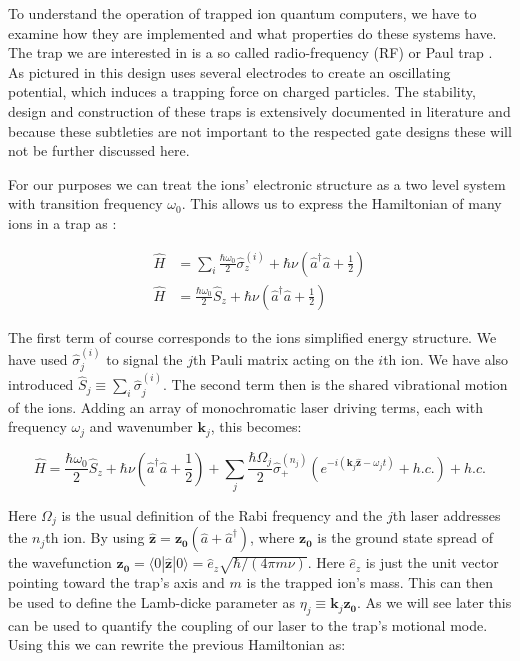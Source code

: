 \documentclass[12pt,twoside]{report}
\begin{document}
To understand the operation of trapped ion quantum computers, we have to examine how they are implemented and what properties do these systems have. The trap we are interested in is a so called radio-frequency (RF) or Paul trap \cite{RF_Traps, Charged_Particle_traps_Paul}. As pictured in  this design uses several electrodes to create an oscillating potential, which induces a trapping force on charged particles. The stability, design and construction of these traps is extensively documented in literature \cite{Charged_Particle_traps_Paul,RF_Traps} and because these subtleties are not important to the respected gate designs these will not be further discussed here.

For our purposes we can treat the ions' electronic structure as a two level system with transition frequency $\omega_0$. This allows us to express the Hamiltonian of many ions in a trap as \cite{RF_Traps}:

\begin{align}
	\hat{H} &= \sum_{i} \frac{\hbar \omega_0}{2}\hat{\sigma}_z^{\left(i\right)} + \hbar\nu\left(\hat{a}^\dagger\hat{a} + \frac{1}{2}\right)
	\label{eq:RF_Trap_H}\\
	\hat{H} &= \frac{\hbar \omega_0}{2}\hat{S}_z + \hbar\nu\left(\hat{a}^\dagger\hat{a} + \frac{1}{2}\right)
	\label{eq:RF_Trap_H_S}
\end{align}

The first term of course corresponds to the ions simplified energy structure. We have used $\hat{\sigma}_j^{\left(i\right)}$ to signal the $j$th Pauli matrix acting on the $i$th ion. We have also introduced $\hat{S}_j \equiv \sum_{i} \hat{\sigma}_j^{\left(i\right)}$. The second term then is the shared vibrational motion of the ions. Adding an array of monochromatic laser driving terms, each with frequency $\omega_j$ and wavenumber $\mathbf{k}_j$, this becomes:

\begin{equation}
	\hat{H} = \frac{\hbar \omega_0}{2}\hat{S}_z + \hbar\nu\left(\hat{a}^\dagger\hat{a} + \frac{1}{2}\right) + \sum_{j}\frac{\hbar\Omega_j}{2}\hat{\sigma}^{\left(n_j\right)}_+\left(e^{-i\left(\mathbf{k}_j\mathbf{\hat{z}} - \omega_jt\right)} + h.c.\right) + h.c.
	\label{eq:RF_Trap_H_driven}
\end{equation}

Here $\Omega_j$ is the usual definition of the Rabi frequency \cite{Foot} and the $j$th laser addresses the $n_j$th ion. By using $\mathbf{\hat{z}} = \mathbf{z_0}\left(\hat{a} + \hat{a}^\dagger\right)$, where $\mathbf{z_0}$ is the ground state spread of the wavefunction $\mathbf{z_0} = \langle0|\mathbf{\hat{z}}|0\rangle=\hat{e}_z\sqrt{\hbar/(4\pi m\nu)}$. Here $\hat{e}_z$ is just the unit vector pointing toward the trap's axis and $m$ is the trapped ion's mass\cite{Experiment_setup}. This can then be used to define the Lamb-dicke parameter\cite{Sideband_cooling_penning_trap} as $\eta_j\equiv\mathbf{k}_j\mathbf{z_0}$. As we will see later this can be used to quantify the coupling of our laser to the trap's motional mode. Using this we can rewrite the previous Hamiltonian as:
\end{document}
